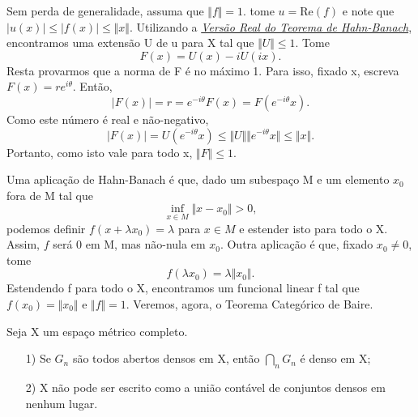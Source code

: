 \documentclass[MeasureTheory/measure_theory.tex]{subfiles}
\begin{document}
\begin{proof*}
	Sem perda de generalidade, assuma que \(\Vert f \Vert = 1.\) tome \(u= \mathrm{Re}(f)\) e note que \(|u(x)|\leq |f(x)|\leq \Vert x \Vert.\) Utilizando a \hyperlink{real_hahn_banach}{\textit{Versão Real do Teorema de Hahn-Banach}}, encontramos uma extensão U de u para X tal que \(\Vert U \Vert \leq 1.\) Tome
	\[
		F(x) = U(x) - iU(ix).
	\]
	Resta provarmos que a norma de F é no máximo 1. Para isso, fixado x, escreva \(F(x) = re^{i\theta }.\) Então,
	\[
		|F(x)| = r = e^{-i\theta }F(x) = F(e^{-i\theta }x).
	\]
	Como este número é real e não-negativo,
	\[
		|F(x)| = U(e^{-i\theta }x)\leq \Vert U \Vert\Vert e^{-i\theta }x \Vert\leq \Vert x \Vert.
	\]
	Portanto, como isto vale para todo x, \(\Vert F \Vert \leq 1\). \qedsymbol
\end{proof*}
Uma aplicação de Hahn-Banach é que, dado um subespaço M e um elemento \(x_{0}\) fora de M tal que
\[
	\inf_{x\in M}\Vert x-x_{0} \Vert > 0,
\]
podemos definir \(f(x+\lambda x_{0}) = \lambda \) para \(x\in M\) e estender isto para todo o X. Assim, \(f\) será 0 em M, mas não-nula em \(x_{0}\). Outra aplicação é que, fixado \(x_{0}\neq 0\), tome
\[
	f(\lambda x_{0}) = \lambda \Vert x_{0} \Vert.
\]
Estendendo f para todo o X, encontramos um funcional linear f tal que \(f(x_{0}) = \Vert x_{0} \Vert \) e \(\Vert f \Vert = 1\).
Veremos, agora, o Teorema Categórico de Baire.
\hypertarget{baire_category}{
	\begin{theorem*}
		Seja X um espaço métrico completo.
		\begin{itemize}
			\item[1)] Se \(G_{n}\) são todos abertos densos em X, então \(\bigcap_{n}^{}G_{n}\) é denso em X;
			\item[2)] X não pode ser escrito como a união contável de conjuntos densos em nenhum lugar.
		\end{itemize}
	\end{theorem*}
}
\end{document}
